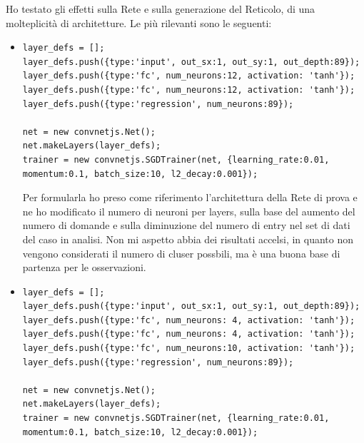 Ho testato gli effetti sulla Rete e sulla generazione del Reticolo, di una molteplicit\`a di architetture. Le pi\`u rilevanti sono le seguenti:
\begin{itemize}
\item \begin{verbatim}
layer_defs = [];
layer_defs.push({type:'input', out_sx:1, out_sy:1, out_depth:89});
layer_defs.push({type:'fc', num_neurons:12, activation: 'tanh'});
layer_defs.push({type:'fc', num_neurons:12, activation: 'tanh'});
layer_defs.push({type:'regression', num_neurons:89});
        
net = new convnetjs.Net();
net.makeLayers(layer_defs);
trainer = new convnetjs.SGDTrainer(net, {learning_rate:0.01, 
momentum:0.1, batch_size:10, l2_decay:0.001});
\end{verbatim}
\noindent
Per formularla ho preso come riferimento l'architettura della Rete di prova e ne ho modificato il numero di neuroni per layers, sulla base del aumento del numero di domande e sulla diminuzione del numero di entry nel set di dati del caso in analisi. Non mi aspetto abbia dei risultati accelsi, in quanto non vengono considerati il numero di cluser possbili, ma è una buona base di partenza per le osservazioni.
\item \begin{verbatim}
layer_defs = [];
layer_defs.push({type:'input', out_sx:1, out_sy:1, out_depth:89});
layer_defs.push({type:'fc', num_neurons: 4, activation: 'tanh'});
layer_defs.push({type:'fc', num_neurons: 4, activation: 'tanh'});
layer_defs.push({type:'fc', num_neurons:10, activation: 'tanh'});
layer_defs.push({type:'regression', num_neurons:89});
        
net = new convnetjs.Net();
net.makeLayers(layer_defs);
trainer = new convnetjs.SGDTrainer(net, {learning_rate:0.01, 
momentum:0.1, batch_size:10, l2_decay:0.001});
\end{verbatim}


\end{itemize}

